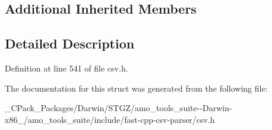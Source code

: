 \subsection*{Additional Inherited Members}


\subsection{Detailed Description}


Definition at line 541 of file csv.\+h.



The documentation for this struct was generated from the following file\+:\begin{DoxyCompactItemize}
\item 
\+\_\+\+C\+Pack\+\_\+\+Packages/\+Darwin/\+S\+T\+G\+Z/amo\+\_\+tools\+\_\+suite-\/-\/\+Darwin-\/x86\+\_/amo\+\_\+tools\+\_\+suite/include/fast-\/cpp-\/csv-\/parser/csv.\+h\end{DoxyCompactItemize}
